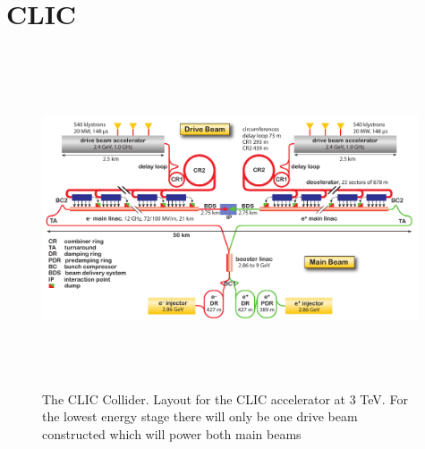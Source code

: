 \section{CLIC}

\begin{figure}
  \centering
  \includegraphics[width=0.99\textwidth,height=10cm,keepaspectratio]{Experiments/fig/CLIC-layout-3TeV}
  \caption[The CLIC Experiment]{The CLIC Collider. Layout for the CLIC accelerator at 3 TeV. For the lowest energy stage there will only be one drive beam constructed which will power both main beams\cite{CDR}}
  \label{Fig:CLIC}
\end{figure}

